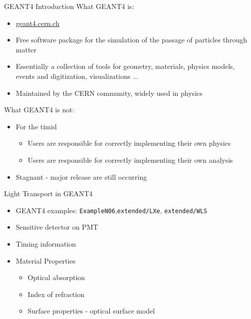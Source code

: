 \begin{frame}[fragile]{GEANT4 Introduction}
What GEANT4 is:
\begin{itemize}
  \small
  \item \href{geant4.cern.ch}{geant4.cern.ch}
  \item Free software package for the simulation of the passage of particles through matter
  \item Essentially a collection of tools for geometry, materials, physics models, events and digitization, visualizations $\dots$
  \item Maintained by the CERN community, widely used in physics
\end{itemize}
What GEANT4 is not:
\begin{itemize}
  \small
  \item For the timid
  \begin{itemize}
    \item Users are responsible for correctly implementing their own physics
    \item Users are responsible for correctly implementing their own analysis
  \end{itemize}
  \item Stagnant - major release are still occurring
\end{itemize}
\hyperlink{G4Main}{}
\hyperlink{toc}{}
\end{frame}
\begin{frame}[fragile]{Light Transport in GEANT4}
\begin{itemize}
  \item GEANT4 examples: \verb+ExampleN06+,\verb+extended/LXe+, \verb+extended/WLS+
  \item Sensitive detector on PMT
  \item Timing information
  \item Material Properties
  \small
  \begin{itemize}
    \item Optical absorption
    \item Index of refraction
    \item Surface properties - optical surface model \cite{5485130}
  \end{itemize}
\end{itemize}
\hyperlink{G4Main}{}
\hyperlink{G4LightMain}{}
\hyperlink{toc}{}
\end{frame}
